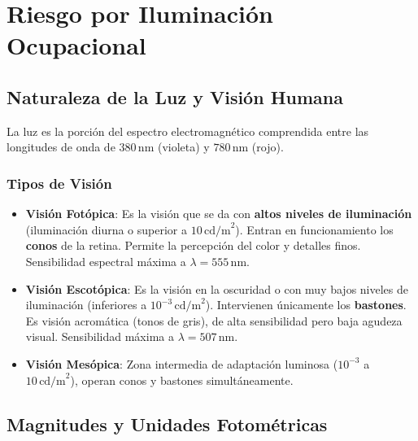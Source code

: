 \documentclass[]{informeutn}
\begin{document}
\chapter{Riesgo por Iluminación Ocupacional}

\section{Naturaleza de la Luz y Visión Humana}
La luz es la porción del espectro electromagnético comprendida entre las longitudes de onda de $380\,\text{nm}$ (violeta) y $780\,\text{nm}$ (rojo).

\subsection{Tipos de Visión}
\begin{itemize}
    \item \textbf{Visión Fotópica}: Es la visión que se da con \textbf{altos niveles de iluminación} (iluminación diurna o superior a $10\,\text{cd/m}^2$). Entran en funcionamiento los \textbf{conos} de la retina. Permite la percepción del color y detalles finos. Sensibilidad espectral máxima a $\lambda = 555\,\text{nm}$.
    \item \textbf{Visión Escotópica}: Es la visión en la oscuridad o con muy bajos niveles de iluminación (inferiores a $10^{-3}\,\text{cd/m}^2$). Intervienen únicamente los \textbf{bastones}. Es visión acromática (tonos de gris), de alta sensibilidad pero baja agudeza visual. Sensibilidad máxima a $\lambda = 507\,\text{nm}$.
    \item \textbf{Visión Mesópica}: Zona intermedia de adaptación luminosa ($10^{-3}$ a $10\,\text{cd/m}^2$), operan conos y bastones simultáneamente.
\end{itemize}

\section{Magnitudes y Unidades Fotométricas}
\end{document}
